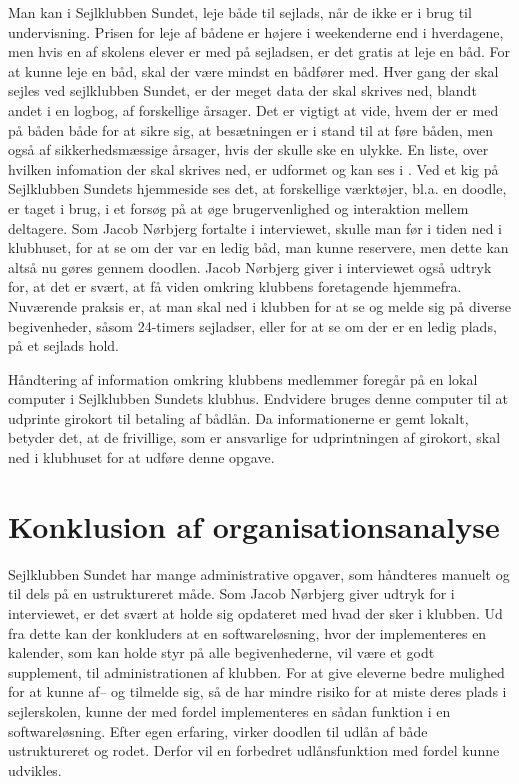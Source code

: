 Man kan i Sejlklubben Sundet, leje både til sejlads, når de ikke er i brug til undervisning. 
Prisen for leje af bådene er højere i weekenderne end i hverdagene, men hvis en af skolens elever er med på sejladsen, er det gratis at leje en båd. 
For at kunne leje en båd, skal der være mindst en bådfører med.
Hver gang der skal sejles ved sejlklubben Sundet, er der meget data der skal skrives ned, blandt andet i en logbog, af forskellige årsager. 
Det er vigtigt at vide, hvem der er med på båden både for at sikre sig, at besætningen er i stand til at føre båden, men også af sikkerhedsmæssige årsager, hvis der skulle ske en ulykke. 
En liste, over hvilken infomation der skal skrives ned, er udformet og kan ses i . 
Ved et kig på Sejlklubben Sundets hjemmeside \citep{SundetUdlaan} ses det, at forskellige værktøjer, bl.a. en doodle, er taget i brug, i et forsøg på at øge brugervenlighed og interaktion mellem deltagere. 
Som Jacob Nørbjerg fortalte i interviewet, skulle man før i tiden ned i klubhuset, for at se om der var en ledig båd, man kunne reservere, men dette kan altså nu gøres gennem doodlen. 
Jacob Nørbjerg giver i interviewet også udtryk for, at det er svært, at få viden omkring klubbens foretagende hjemmefra. 
Nuværende praksis er, at man skal ned i klubben for at se og melde sig på diverse begivenheder, såsom 24-timers sejladser, eller for at se om der er en ledig plads, på et sejlads hold.

Håndtering af information omkring klubbens medlemmer foregår på en lokal computer i Sejlklubben Sundets
klubhus. Endvidere bruges denne computer til at udprinte girokort til betaling af bådlån. Da informationerne
er gemt lokalt, betyder det, at de frivillige, som er ansvarlige for udprintningen af girokort, skal ned i
klubhuset for at udføre denne opgave.


\section{Konklusion af organisationsanalyse}\label{sec:organisation-konklusion}

Sejlklubben Sundet har mange administrative opgaver, som håndteres manuelt og til dels på en ustruktureret
måde. 
Som Jacob Nørbjerg giver udtryk for i interviewet, er det svært at holde sig opdateret med hvad der sker i klubben. Ud fra dette kan der konkluders at en softwareløsning, hvor der implementeres en kalender, som kan holde styr på alle begivenhederne, vil være et godt supplement, til administrationen af klubben. 
For at give eleverne bedre mulighed for at kunne af-- og tilmelde sig, så de har mindre risiko for at miste deres plads i sejlerskolen, kunne der med fordel implementeres en sådan funktion i en softwareløsning. 
Efter egen erfaring, virker doodlen til udlån af både ustruktureret og rodet. 
Derfor vil en forbedret udlånsfunktion med fordel kunne udvikles.

